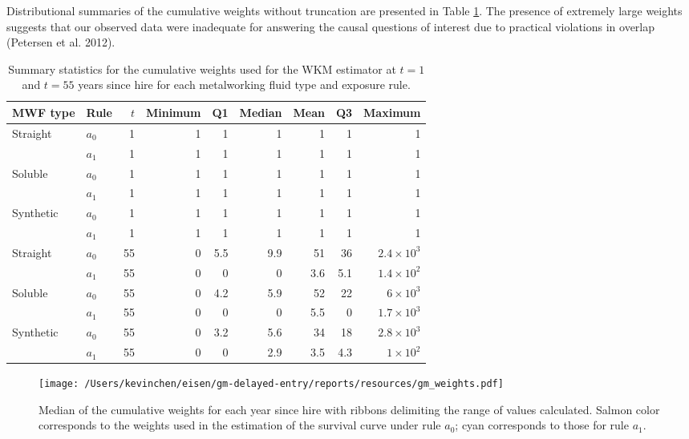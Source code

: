 \documentclass[
  11pt,
]{article}
\begin{document}
Distributional summaries of the cumulative weights without truncation
are presented in Table \ref{tab:gm_w}. The presence of extremely large
weights suggests that our observed data were inadequate for answering
the causal questions of interest due to practical violations in overlap
(Petersen et al. 2012).

\begin{table}[H]
\centering
\caption{Summary statistics for the cumulative weights used for the WKM estimator at $t = 1$ and $t = 55$ years since hire for each metalworking fluid type and exposure rule.} 
\label{tab:gm_w}
\begin{tabular}{llrrrrrrr}
  \toprule
MWF type & Rule & $t$ & Minimum & Q1 & Median & Mean & Q3 & Maximum \\ 
  \midrule
Straight & $a_0$ &   1 &   1 &   1 &   1 &   1 &   1 &   1 \\ 
   & $a_1$ &   1 &   1 &   1 &   1 &   1 &   1 &   1 \\ 
  Soluble & $a_0$ &   1 &   1 &   1 &   1 &   1 &   1 &   1 \\ 
   & $a_1$ &   1 &   1 &   1 &   1 &   1 &   1 &   1 \\ 
  Synthetic & $a_0$ &   1 &   1 &   1 &   1 &   1 &   1 &   1 \\ 
   & $a_1$ &   1 &   1 &   1 &   1 &   1 &   1 &   1 \\ 
  Straight & $a_0$ &  55 &   0 & 5.5 & 9.9 &  51 &  36 & $2.4 \times 10^{3}$ \\ 
   & $a_1$ &  55 &   0 &   0 &   0 & 3.6 & 5.1 & $1.4 \times 10^{2}$ \\ 
  Soluble & $a_0$ &  55 &   0 & 4.2 & 5.9 &  52 &  22 & $6 \times 10^{3}$ \\ 
   & $a_1$ &  55 &   0 &   0 &   0 & 5.5 &   0 & $1.7 \times 10^{3}$ \\ 
  Synthetic & $a_0$ &  55 &   0 & 3.2 & 5.6 &  34 &  18 & $2.8 \times 10^{3}$ \\ 
   & $a_1$ &  55 &   0 &   0 & 2.9 & 3.5 & 4.3 & $1 \times 10^{2}$ \\ 
   \bottomrule
\end{tabular}
\end{table}

\begin{figure}
\caption{Median of the cumulative weights for each year since hire with ribbons delimiting the range of values calculated. Salmon color corresponds to the weights used in the estimation of the survival curve under rule $a_0$; cyan corresponds to those for rule $a_1$.}
\label{fig:gm_weights}
\begin{center}
\texttt{[image: /Users/kevinchen/eisen/gm-delayed-entry/reports/resources/gm\_weights.pdf]}
\end{center}
\end{figure}
\end{document}
